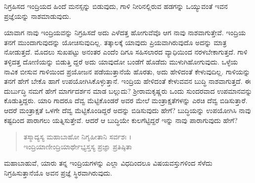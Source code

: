{\small ನಿಗ್ರಹಿಸದ ಇಂದ್ರಿಯದ ಹಿಂದೆ ಮನಸ್ಸನ್ನು ಬಿಡುವುದು, ಗಾಳಿ ನೀರಿನಲ್ಲಿರುವ ಹಡಗನ್ನು ಒಯ್ಯುವಂತೆ ಇವನ ಪ್ರಜ್ಞೆಯನ್ನು ನಾಶಮಾಡುವುದು.}

ಯಾವಾಗ ನಾವು ಇಂದ್ರಿಯವನ್ನು ನಿಗ್ರಹಿಸದೆ ಅದು ಎಳೆದತ್ತ ಹೋಗುವೆವೊ ಆಗ ನಾವು ನಾಶವಾಗುತ್ತೇವೆ. ಇಂದ್ರಿಯ ತನಗೆ ಮುಂದಾಗುವುದನ್ನು ಯೋಚಿಸುವುದಿಲ್ಲ. ತತ್ಕಾಲಕ್ಕೆ ಯಾವುದು ಪ್ರಿಯವಾಗಿರುವುದೊ ಅದನ್ನು ಮಾತ್ರ ನೋಡುತ್ತದೆ. ಮೊದಲು ಸುಖಪಟ್ಟು ಅನಂತರ ಎಂದೆಂ ದಿಗೂ ಸಹಿಸಲಾರದ ವ್ಯಾಧಿಯಿಂದ ನರಳಬೇಕಾಗುತ್ತದೆ. ಗಾಳಿ ತಳ್ಳಿದತ್ತ ದೋಣಿಯನ್ನು ಬಿಡುತ್ತಿ ದ್ದರೆ ಅದು ಯಾವುದೋ ಬಂಡೆಗೆ ಹೊಡೆದು ಮುಳುಗಿಹೋಗುವುದು. ಒಳ್ಳೆಯ ನಾವಿಕ ಬೀಸುವ ಗಾಳಿಯಿಂದ ಪ್ರಯೋಜನ ಪಡೆಯುತ್ತಾನೆಯೆ ಹೊರತು, ಅದು ಹೇಳಿದಂತೆ ಕೇಳುವುದಿಲ್ಲ. ಗಾಳಿಯನ್ನು ತನಗೆ ಹೇಗೆ ಬೇಕೊ ಹಾಗೆ ಉಪಯೋಗಿಸಿಕೊಳ್ಳುತ್ತಾನೆ. ಇಂದ್ರಿಯ ಹೇಳಿದಂತೆ ಕೇಳುವವನ ಬುದ್ಧಿ ನಾಶವಾಗುತ್ತದೆ. ಈ ದುರ್ಬುದ್ಧಿ ನಮಗೆ ಹೇಗೆ ಮಾರ್ಗದರ್ಶನ ಮಾಡ ಬಲ್ಲುದು? ಶ್ರೀರಾಮಕೃಷ್ಣರು ಒಂದು ಸುಂದರವಾದ ಉಪಮಾನವನ್ನು ಕೊಡುತ್ತಿದ್ದರು. ಯಾರಿ ಗಾದರೂ ದೆವ್ವ ಮೆಟ್ಟಿಕೊಂಡರೆ ಅವರ ಮೇಲೆ ಮಂತ್ರಾಕ್ಷತೆಗಳನ್ನು ಎರಚಿ ದೆವ್ವ ಬಿಡಿಸುತ್ತಾರೆ. ಆದರೆ ಮಂತ್ರಾಕ್ಷತೆ ಒಳಗೇ ದೆವ್ವ ಮೆಟ್ಟಿಕೊಂಡಿದ್ದರೆ ಅದನ್ನು ಬಿಡಿಸುವುದು ಹೇಗೆ? ಬುದ್ಧಿಯನ್ನು ಉಪಯೋಗಿಸಿ ನಾವು ಕಷ್ಟದಿಂದ ಪಾರಾಗಲು ಯತ್ನಿಸುತ್ತೇವೆ. ಆದರೆ ಆ ಬುದ್ಧಿಯೇ ಕುಲಗೆಟ್ಟಿದ್ದರೆ ಇನ್ನು ನಾವು ಪಾರಾಗುವುದು ಹೇಗೆ?\\

\begin{verse}
ತಸ್ಮಾದ್ಯಸ್ಯ ಮಹಾಬಾಹೋ ನಿಗೃಹೀತಾನಿ ಸರ್ವಶಃ ।\\ಇಂದ್ರಿಯಾಣೀಂದ್ರಿಯಾರ್ಥೇಭ್ಯಸ್ತಸ್ಯ ಪ್ರಜ್ಞಾ ಪ್ರತಿಷ್ಠಿತಾ 
\end{verse}

{\small ಮಹಾಬಾಹುವೆ, ಯಾರು ತನ್ನ ಇಂದ್ರಿಯಗಳನ್ನು ಎಲ್ಲಾ ವಿಧದಿಂದಲೂ ವಿಷಯವಸ್ತುಗಳಿಂದ ಸೆಳೆದು ನಿಗ್ರಹಿಸುತ್ತಾನೆಯೊ ಅವನ ಪ್ರಜ್ಞೆ ಸ್ಥಿರವಾಗಿರುವುದು.}

